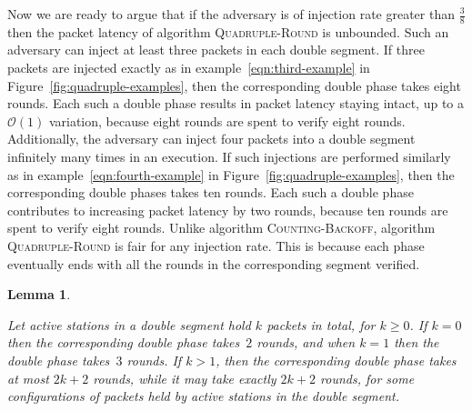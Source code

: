 \documentclass[11pt]{article}
\newcommand{\cO}{{\mathcal O}}
\newtheorem{lemma}{Lemma}
\begin{document}
Now we are ready to argue that if the adversary is of injection rate greater than $\frac{3}{8}$ then the packet latency of algorithm \textsc{Quadruple-Round}  is unbounded.
Such an adversary can inject at least three packets in each double segment.
If three packets are injected exactly as in example~\eqref{eqn:third-example} in Figure~\ref{fig:quadruple-examples}, then the corresponding double phase takes eight rounds.
Each such a double phase results in packet latency staying intact, up to a $\cO(1)$ variation, because eight rounds are spent to verify eight rounds.
Additionally, the adversary can inject four packets into a double segment infinitely many times in an execution.
If such injections are performed similarly as in example~\eqref{eqn:fourth-example} in Figure~\ref{fig:quadruple-examples}, then the corresponding double phases takes ten rounds.
Each such a double phase contributes to increasing packet latency by two rounds, because ten rounds are spent to verify eight rounds.
Unlike algorithm \textsc{Counting-Backoff}, algorithm \textsc{Quadruple-Round} is fair for any injection rate.
This is because each phase eventually ends with all the rounds in the corresponding segment verified.



\begin{lemma}
\label{lem:linear-time}

Let active stations in a double segment hold $k$ packets in total, for $k\ge 0$. 
If $k=0$ then the corresponding double phase takes~$2$ rounds, and when $k=1$ then the double phase takes~$3$ rounds.
If $k > 1$, then the corresponding double phase takes at most $2k+2$ rounds, while it may take exactly $2k+2$ rounds, for some configurations of packets held by active stations in the double segment.
\end{lemma}
\end{document}
